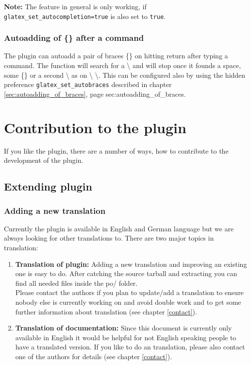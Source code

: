 \documentclass[%
paper=a4,%
fontsize=11pt,%
twoside=false,%
DIV18,
headsepline,
plainheadsepline,
footsepline,
plainfootsepline,
bibliography=totoc,%
listof=totoc,%
BCOR10mm,%
parskip=half,%
openany,%
]{scrartcl}
\begin{document}
\textbf{Note:} The feature in general is only working, if
\texttt{glatex\_set\_autocompletion=true} is also set to \texttt{true}.

\subsubsection{Autoadding of \{\} after a command}

The plugin can autoadd a pair of braces \{\} on hitting return after typing a
command. The function will search for a \textbackslash{} and will
stop once it founds a space, some \{\} or a second \textbackslash{}
as on \textbackslash{} \textbackslash{}. This can be configured also
by using the hidden preference \texttt{glatex\_set\_autobraces}
described in chapter \ref{sec:autoadding_of_braces}, page \pageref
{sec:autoadding_of_braces}.


\section{Contribution to the plugin}
If you like the plugin, there are a number of ways, how to
contribute to the development of the plugin.

\subsection{Extending plugin}

\subsubsection{Adding a new translation}
\label{sec:translating}
Currently the plugin is available in English and German language but
we are always looking for other translations to. There are two major
topics in translation:

\begin{enumerate}
\item \textbf{Translation of plugin:}
	   Adding a new translation and improving an existing one is easy to
	   do. After catching the source tarball and extracting you can find
	   all needed files inside the po/ folder. \\
	   Please contact the authors if you plan to update/add a translation
	   to ensure nobody else is currently working on and avoid double
	   work and to get some further information about translation (see
	   chapter \ref{contact}).
\item \textbf{Translation of documentation:}
	   Since this document is currently only available in English it
	   would be helpful for not English speaking people to have a
	   translated version. If you like to do an translation, please
	   also contact one of the authors for details (see chapter \ref{contact}).
\end{enumerate}
\end{document}
